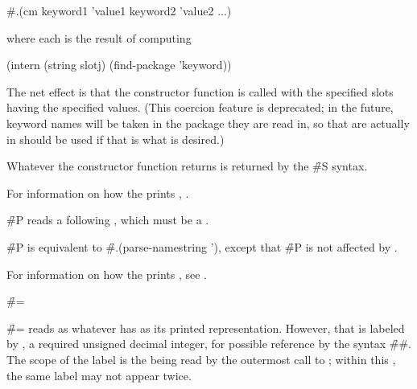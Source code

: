\code
 #.(cm keyword1 'value1 keyword2 'value2 ...)
\endcode

where each  is the result of computing

\code
 (intern (string slotj) (find-package 'keyword))
\endcode
    
The net effect is that the constructor function is called with the specified
slots having the specified values. 
(This coercion feature is deprecated; in the future, keyword names will 
 be taken in the package they are read in, so  that are 
 actually in  should be used if that is what is desired.)

Whatever  the constructor function returns
is returned by the \f{\#S} syntax.

For information on how the  prints ,
\seesection\PrintingStructures.

\endsubsubsection%



\f{\#P} reads a following , which must be a .

\f{\#P} is equivalent to 
\f{\#.(parse-namestring ')},
except that \f{\#P} is not affected by .

For information on how the  prints ,
see \secref\PrintingPathnames.


\endsubsubsection%


\f{\#=}

\f{\#=} reads as whatever 
has  as its printed representation.  However, that 
is labeled by , a required unsigned decimal integer, for
possible reference by the syntax \f{\#\#}.
The scope of the label is the  being read by the outermost
call to ; within this ,
the same label may not appear twice.

